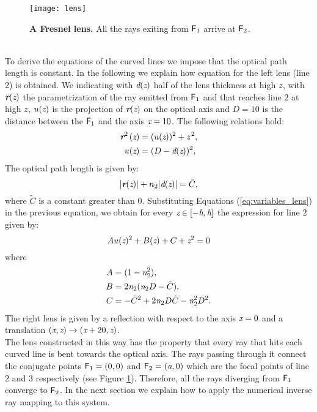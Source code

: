 \begin{figure}[h]
  \begin{center}
  \texttt{[image: lens]}
  \end{center}
  \caption{\textbf{A Fresnel lens.} 
All the rays exiting from $\textsf{F}_1$ arrive at $\textsf{F}_2$.}
\label{fig:real-lens}
 \end{figure}
\\ \indent To derive the equations of the curved lines we impose that the optical path length is constant. In the following we explain how equation for the left lens (line $2$) is obtained. We indicating with $\textit{d}(\textit{z})$ half of the lens thickness at high $\textit{z}$, with $\textit{\textbf{r}}(\textit{z})$ the parametrization of the ray emitted from $\textsf{F}_1$ and that reaches line $2$ at high $\textit{z}$, $u(\textit{z})$ is the projection of $\textit{\textbf{r}}(\textit{z})$ on the optical axis and $D=10$ is the distance between the $\textsf{F}_1$ and the axis $\textit{x}=10$.
The following relations hold:
\begin{equation}\label{eq:variables_lens}
\begin{aligned}
\textit{\textbf{r}}^{2\,}(\textit{z}) &= (u(\textit{z}))^2+\textit{z}^{\,2},\\
u(\textit{z}) &= (D-\textit{d}(\textit{z}))^2, 
\end{aligned}
\end{equation}
The optical path length is given by:
\begin{equation}\label{eq:path_length}
|\textit{\textbf{r}}(\textit{z})|+n_2|\textit{d}(\textit{z})|=\tilde{C},
\end{equation}  
where $\tilde{C}$ is a constant greater than $0$. Substituting Equations (\ref{eq:variables_lens}) in the previous equation,
we obtain for every $\textit{z}\in[-\textit{h}, \textit{h}]$ the expression for line $2$ given by:
\begin{equation}
Au(\textit{z})^2+B(\textit{z})+C+\textit{z}^2 = 0
\end{equation}
where 
\begin{equation}
\begin{aligned}
A & = (1-\textit{n}_2^2), \\
B & = 2\textit{n}_2(\textit{n}_2 D-\tilde{C}), \\
C & = -\tilde{C}^2+2\textit{n}_2 D\tilde{C}-\textit{n}_2^2D^2. \\
\end{aligned}
\end{equation}
The right lens is given by a reflection with respect to the axis $\textit{x}=0$ and a translation $(\textit{x}, \textit{z})\rightarrow (\textit{x}+20, \textit{z})$.
\\ \indent The lens constructed in this way has the property that every ray that hits each curved line is bent towards the optical axis. The rays passing through it connect the conjugate points $\textsf{F}_1 = (0, 0)$ and $\textsf{F}_2= (\textit{a}, 0)$ which are the focal points of line $2$ and $3$ respectively (see Figure \ref{fig:real-lens}). Therefore, all the rays diverging from $\textsf{F}_1$ converge to $\textsf{F}_2$. In the next section we explain how to apply the numerical inverse ray mapping to this system.
